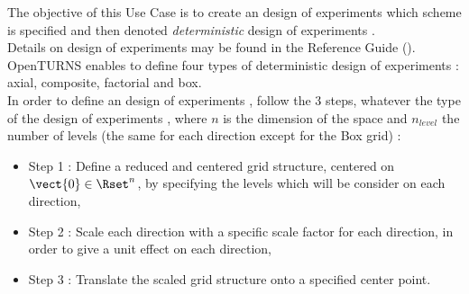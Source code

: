 \renewcommand{\filename}{docUC_MinMax_DetExperimentPlane.tex}
\renewcommand{\filetitle}{UC : Creation of a deterministic design of experiments  : Axial, Box, Composite, Factorial patterns}

\HeaderIIILevel

\label{determExpPlane}




The objective of this Use Case is to create an design of experiments  which scheme is specified and then denoted {\itshape deterministic} design of experiments .\\


Details on design of experiments  may be found in the Reference Guide ().\\

OpenTURNS enables to define four types of deterministic design of experiments : axial, composite, factorial and box.\\

In order to define an design of experiments , follow the 3  steps, whatever the type of the design of experiments , where $n$ is the dimension of the space and $n_{level}$ the number of levels (the same for each direction except for the Box grid) :
\begin{itemize}
\item Step 1 : Define a reduced and centered grid structure, centered on $\vect{0} \in \Rset^n$, by specifying the levels which will be consider on each direction,
\item Step 2 : Scale each direction with a specific scale factor for each direction, in order to give a unit effect on each direction,
\item Step 3 : Translate the scaled grid structure onto a specified center point.
\end{itemize}

